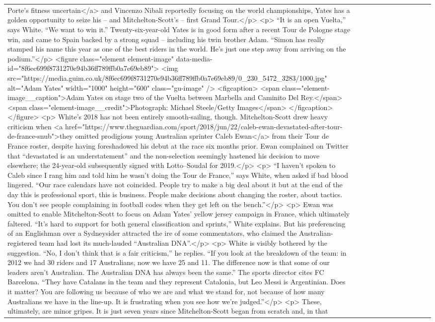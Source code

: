 \documentclass[]{article}
\begin{document}
\begin{table}[!h]
\begin{tabular}[t]{llllllllllll}
Porte’s fitness uncertain</a> and Vincenzo Nibali reportedly focusing on the world championships, Yates has a golden opportunity to seize his – and Mitchelton-Scott’s – first Grand Tour.</p> <p> “It is an open Vuelta,” says White. “We want to win it.” Twenty-six-year-old Yates is in good form after a recent Tour de Pologne stage win, and came to Spain backed by a strong squad – including his twin brother Adam. “Simon has really stamped his name this year as one of the best riders in the world. He’s just one step away from arriving on the podium.”</p>  <figure class="element element-image" data-media-id="8f6ec699f8731270e94b36ff789ffb0a7e69eb89"> <img src="https://media.guim.co.uk/8f6ec699f8731270e94b36ff789ffb0a7e69eb89/0\_230\_5472\_3283/1000.jpg" alt="Adam Yates" width="1000" height="600" class="gu-image" /> <figcaption> <span class="element-image\_\_caption">Adam Yates on stage two of the Vuelta between Marbella and Caminito Del Rey.</span> <span class="element-image\_\_credit">Photograph: Michael Steele/Getty Images</span> </figcaption> </figure>  <p> White’s 2018 has not been entirely smooth-sailing, though. Mitchelton-Scott drew heavy criticism when <a href="https://www.theguardian.com/sport/2018/jun/22/caleb-ewan-devastated-after-tour-de-france-snub">they omitted prodigious young Australian sprinter Caleb Ewan</a> from their Tour de France roster, despite having foreshadowed his debut at the race six months prior. Ewan complained on Twitter that “devastated is an understatement” and the non-selection seemingly hastened his decision to move elsewhere; the 24-year-old subsequently signed with Lotto–Soudal for 2019.</p> <p> “I haven’t spoken to Caleb since I rang him and told him he wasn’t doing the Tour de France,” says White, when asked if bad blood lingered. “Our race calendars have not coincided. People try to make a big deal about it but at the end of the day this is professional sport, this is business. People make decisions about changing the roster, about tactics. You don’t see people complaining in football codes when they get left on the bench.”</p> <p> Ewan was omitted to enable Mitchelton-Scott to focus on Adam Yates’ yellow jersey campaign in France, which ultimately faltered. “It’s hard to support for both general classification and sprints,” White explains. But his preferencing of an Englishman over a Sydneysider attracted the ire of some commentators, who claimed the Australian-registered team had lost its much-lauded “Australian DNA”.</p> <p> White is visibly bothered by the suggestion. “No, I don’t think that is a fair criticism,” he replies. “If you look at the breakdown of the team: in 2012 we had 30 riders and 17 Australians, now we have 25 and 11. The difference now is that some of our leaders aren’t Australian. The Australian DNA has always been the same.” The sports director cites FC Barcelona. “They have Catalans in the team and they represent Catalonia, but Leo Messi is Argentinian. Does it matter? You are following us because of who we are and what we stand for, not because of how many Australians we have in the line-up. It is frustrating when you see how we’re judged.”</p> <p> These, ultimately, are minor gripes. It is just seven years since Mitchelton-Scott began from scratch and, in that 
\end{tabular}
\end{table}
\end{document}
